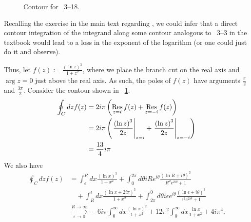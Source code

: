 \item

\begin{figure}[h]
	\centering
	\caption{Contour for ~3--18.}%
	\label{fig:problem3-18}
\end{figure}

Recalling the exercise in the main text regarding ,
we could infer that a direct contour integration of the integrand along some contour analogous to ~3--3
in the textbook would lead to a loss in the exponent of the logarithm (or one could just do it and observe).

Thus, let $f(z) := \frac{{\left( \ln z \right)}^3}{1 + z^2}$,
where we place the branch cut on the real axis and $\arg z = 0$ just above the real axis.
As such, the poles of $f(z)$ have arguments $\frac{\pi}{2}$ and $\frac{3\pi}{2}$.
Consider the contour shown in ~\ref{fig:problem3-18}.
\begin{align*}
	\oint_C dz f(z)
	&= 2i\pi \left( \mathop{\mathrm{Res}}_{z=i} f(z) + \mathop{\mathrm{Res}}_{z=-i} f(z) \right) \\
	&= 2i\pi \left( {\left. \frac{{\left( \ln z \right)}^3}{2z} \right|}_{z=i} + {\left. \frac{{\left( \ln z \right)}^3}{2z} \right|}_{z=-i} \right) \\
	&= \frac{13}{4}i\pi
\end{align*}
We also have
\begin{align*}
    \oint_C dz f(z)
    &= \int_\epsilon^R dx \frac{{\left( \ln x \right)}^3}{1 +x^2}
     + \int_0^{2\pi} d\theta iRe^{i\theta} \frac{{\left( \ln R + i\theta\right)}^3}{R^2 e^{2i\theta} + 1} \\
    &\quad + \int_R^\epsilon dx \frac{{\left( \ln x + 2i\pi \right)}^3}{1 + x^2}
     + \int_{2\pi}^0 d\theta i\epsilon e^{i\theta} \frac{{\left(\ln\epsilon + i\theta\right)}^3}{\epsilon^2 e^{2i\theta} + 1} \\
    &\xrightarrow[\epsilon \rightarrow 0]{R \rightarrow \infty}
        -6i\pi \int_0^\infty dx \frac{{\left( \ln x \right)}^2}{1 + x^2}
	+ 12\pi^2 \int_0^\infty dx \frac{\ln x}{1 + x^2}
	+ 4i\pi^4.
\end{align*}

